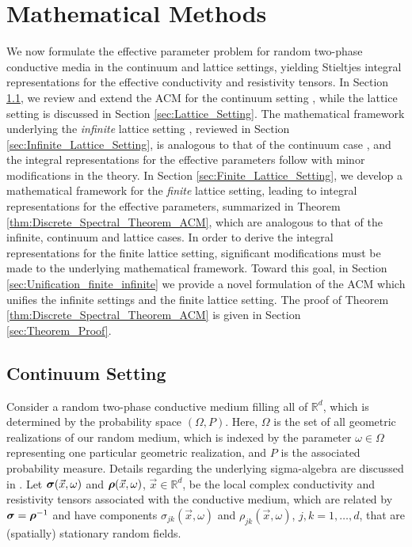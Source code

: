 \documentclass{cmslatex}
\newcommand\bsig{\mbox{\boldmath${\sigma}$}}
\newcommand\brho{\mbox{\boldmath${\rho}$}}
\begin{document}
    

\section{Mathematical Methods}\label{sec:Mathematical_Methods} 
%
We now formulate the effective parameter problem for random
two-phase conductive media in the continuum and lattice settings,
yielding Stieltjes integral representations for the effective
conductivity and resistivity tensors. In Section
\ref{sec:Continuum_Setting}, we review and extend the ACM for the
continuum setting \cite{Golden:CMP-473}, while the lattice setting is
discussed in Section \ref{sec:Lattice_Setting}. The mathematical
framework underlying the \emph{infinite} lattice setting
\cite{Bruno:JSP-365,Golden:CMP-467}, reviewed in Section 
\ref{sec:Infinite_Lattice_Setting}, is analogous to that of
the continuum case \cite{Bruno:JSP-365}, and the integral
representations for the effective parameters follow with minor
modifications in the theory. In Section
\ref{sec:Finite_Lattice_Setting}, we develop a mathematical
framework for the \emph{finite} lattice setting, leading to integral 
representations for the effective parameters, summarized in Theorem 
\ref{thm:Discrete_Spectral_Theorem_ACM}, which are analogous to that
of the infinite, continuum and lattice cases. In order to derive the
integral representations for the finite lattice setting, significant
modifications must be made to the underlying mathematical
framework. Toward this goal, in Section
\ref{sec:Unification_finite_infinite} we provide a novel formulation
of the ACM which unifies the infinite settings and the finite lattice
setting. The proof of Theorem \ref{thm:Discrete_Spectral_Theorem_ACM}
is given in Section \ref{sec:Theorem_Proof}.    



\subsection{Continuum Setting}\label{sec:Continuum_Setting}
%
Consider a random two-phase conductive medium filling all of
$\mathbb{R}^d$, which is determined by the probability space
$(\Omega,P)$. Here, $\Omega$ is the set of all  geometric realizations of our
random medium, which is indexed by the parameter $\omega\in\Omega$ representing
one particular geometric realization, and $P$ is the associated
probability measure. Details regarding the underlying sigma-algebra
are discussed in \cite{Papanicolaou:RF-835}. Let $\bsig(\vec{x},\omega)$
and $\brho(\vec{x},\omega)$, $\vec{x}\in\mathbb{R}^d$, be the local complex
conductivity and resistivity tensors associated with the conductive
medium, which are related by $\bsig=\brho^{-1}$ and have components
$\sigma_{jk}(\vec{x},\omega)$ and $\rho_{jk}(\vec{x},\omega)$, $j,k=1,\ldots,d$, that are
(spatially) stationary random fields. 
\end{document}
